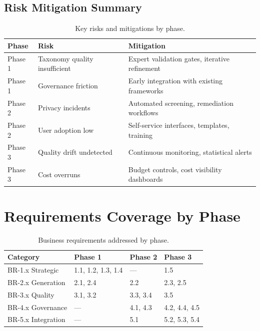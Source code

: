 \subsection{Risk Mitigation Summary}

\begin{table}[htbp]
\centering
\caption{Key risks and mitigations by phase.}
\label{tab:phase-risks}
\footnotesize
\begin{tabularx}{\textwidth}{@{}l l X@{}}
\toprule
\textbf{Phase} & \textbf{Risk} & \textbf{Mitigation} \\
\midrule
Phase 1 & Taxonomy quality insufficient & Expert validation gates, iterative refinement \\
Phase 1 & Governance friction & Early integration with existing frameworks \\
Phase 2 & Privacy incidents & Automated screening, remediation workflows \\
Phase 2 & User adoption low & Self-service interfaces, templates, training \\
Phase 3 & Quality drift undetected & Continuous monitoring, statistical alerts \\
Phase 3 & Cost overruns & Budget controls, cost visibility dashboards \\
\bottomrule
\end{tabularx}
\end{table}


\section{Requirements Coverage by Phase}

\begin{table}[htbp]
\centering
\caption{Business requirements addressed by phase.}
\label{tab:req-by-phase}
\scriptsize
\begin{tabularx}{\textwidth}{@{}l X X X@{}}
\toprule
\textbf{Category} & \textbf{Phase 1} & \textbf{Phase 2} & \textbf{Phase 3} \\
\midrule
BR-1.x Strategic & 1.1, 1.2, 1.3, 1.4 & --- & 1.5 \\
BR-2.x Generation & 2.1, 2.4 & 2.2 & 2.3, 2.5 \\
BR-3.x Quality & 3.1, 3.2 & 3.3, 3.4 & 3.5 \\
BR-4.x Governance & --- & 4.1, 4.3 & 4.2, 4.4, 4.5 \\
BR-5.x Integration & --- & 5.1 & 5.2, 5.3, 5.4 \\
\bottomrule
\end{tabularx}
\end{table}


